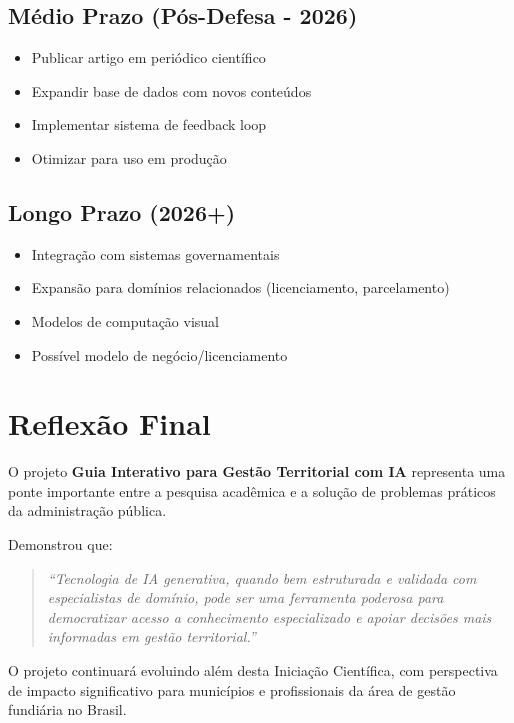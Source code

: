 \documentclass[12pt,a4paper]{report}
\begin{document}
\subsection{Médio Prazo (Pós-Defesa - 2026)}

\begin{itemize}
  \item Publicar artigo em periódico científico
  \item Expandir base de dados com novos conteúdos
  \item Implementar sistema de feedback loop
  \item Otimizar para uso em produção
\end{itemize}

\subsection{Longo Prazo (2026+)}

\begin{itemize}
  \item Integração com sistemas governamentais
  \item Expansão para domínios relacionados (licenciamento, parcelamento)
  \item Modelos de computação visual
  \item Possível modelo de negócio/licenciamento
\end{itemize}

\section{Reflexão Final}

O projeto \textbf{Guia Interativo para Gestão Territorial com IA} representa uma ponte importante entre a pesquisa acadêmica e a solução de problemas práticos da administração pública. 

Demonstrou que:

\begin{quote}
  \textit{``Tecnologia de IA generativa, quando bem estruturada e validada com especialistas de domínio, pode ser uma ferramenta poderosa para democratizar acesso a conhecimento especializado e apoiar decisões mais informadas em gestão territorial.''}
\end{quote}

O projeto continuará evoluindo além desta Iniciação Científica, com perspectiva de impacto significativo para municípios e profissionais da área de gestão fundiária no Brasil.
\end{document}
